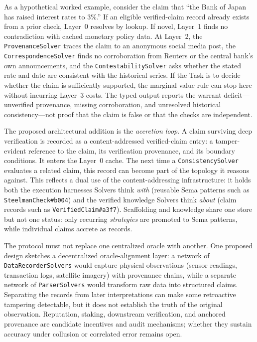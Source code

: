 \documentclass[11pt]{article}
\let\oldtexttt\texttt
\renewcommand{\texttt}[1]{\oldtexttt{\small #1}}
\begin{document}
As a hypothetical worked example, consider the claim that ``the Bank of Japan has raised interest rates to 3\%.'' If an eligible verified-claim record already exists from a prior check, Layer~0 resolves by lookup. If novel, Layer~1 finds no contradiction with cached monetary policy data. At Layer~2, the \texttt{ProvenanceSolver} traces the claim to an anonymous social media post, the \texttt{CorrespondenceSolver} finds no corroboration from Reuters or the central bank's own announcements, and the \texttt{ContestabilitySolver} asks whether the stated rate and date are consistent with the historical series. If the Task is to decide whether the claim is sufficiently supported, the marginal-value rule can stop here without incurring Layer~3 costs. The typed output reports the warrant deficit---unverified provenance, missing corroboration, and unresolved historical consistency---not proof that the claim is false or that the checks are independent.

The proposed architectural addition is the \emph{accretion loop}. A claim surviving deep verification is recorded as a content-addressed verified-claim entry: a tamper-evident reference to the claim, its verification provenance, and its boundary conditions. It enters the Layer~0 cache. The next time a \texttt{ConsistencySolver} evaluates a related claim, this record can become part of the topology it reasons against. This reflects a dual use of the content-addressing infrastructure: it holds both the execution harnesses Solvers think \emph{with} (reusable Sema patterns such as \texttt{SteelmanCheck\#b004}) and the verified knowledge Solvers think \emph{about} (claim records such as \texttt{VerifiedClaim\#a3f7}). Scaffolding and knowledge share one store but not one status: only recurring \emph{strategies} are promoted to Sema patterns, while individual claims accrete as records.

The protocol must not replace one centralized oracle with another. One proposed design sketches a decentralized oracle-alignment layer: a network of \texttt{DataRecorderSolvers} would capture physical observations (sensor readings, transaction logs, satellite imagery) with provenance chains, while a separate network of \texttt{ParserSolvers} would transform raw data into structured claims. Separating the records from later interpretations can make some retroactive tampering detectable, but it does not establish the truth of the original observation. Reputation, staking, downstream verification, and anchored provenance are candidate incentives and audit mechanisms; whether they sustain accuracy under collusion or correlated error remains open.
\end{document}
